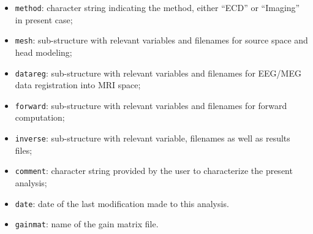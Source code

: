 \begin{itemize}
    \item \texttt{method}: character string indicating the method, either ``ECD'' or ``Imaging'' in present case;
    \item \texttt{mesh}: sub-structure with relevant variables and filenames for source space and head modeling;
    \item \texttt{datareg}: sub-structure with relevant variables and filenames for EEG/MEG data registration into MRI space;
    \item \texttt{forward}: sub-structure with relevant variables and filenames for forward computation;
    \item \texttt{inverse}: sub-structure with relevant variable, filenames as well as results files;
    \item \texttt{comment}: character string provided by the user to characterize the present analysis;
    \item \texttt{date}: date of the last modification made to this analysis.
    \item \texttt{gainmat}: name of the gain matrix file.
\end{itemize}
